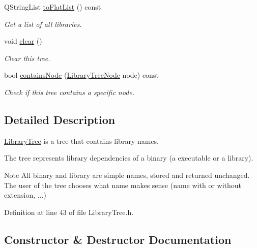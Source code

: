 \begin{DoxyCompactItemize}
Q\+String\+List \hyperlink{class_mdt_1_1_deploy_utils_1_1_library_tree_a7ee09eb33f1f392b66017d3ab7475f53}{to\+Flat\+List} () const 
\begin{DoxyCompactList}\small\item\em Get a list of all libraries. \end{DoxyCompactList}\item 
void \hyperlink{class_mdt_1_1_deploy_utils_1_1_library_tree_a1035b22adbe9c119339ce83a33ed8eba}{clear} ()
\begin{DoxyCompactList}\small\item\em Clear this tree. \end{DoxyCompactList}\item 
bool \hyperlink{class_mdt_1_1_deploy_utils_1_1_library_tree_a87fc3fa448d541cc97e6dd31f6288376}{contains\+Node} (\hyperlink{class_mdt_1_1_deploy_utils_1_1_library_tree_node}{Library\+Tree\+Node} node) const 
\begin{DoxyCompactList}\small\item\em Check if this tree contains a specific node. \end{DoxyCompactList}\end{DoxyCompactItemize}


\subsection{Detailed Description}
\hyperlink{class_mdt_1_1_deploy_utils_1_1_library_tree}{Library\+Tree} is a tree that contains library names. 

The tree represents library dependencies of a binary (a executable or a library).

\begin{DoxyNote}{Note}
All binary and library are simple names, stored and returned unchanged. The user of the tree chooses what name makes sense (name with or without extension, ...) 
\end{DoxyNote}


Definition at line 43 of file Library\+Tree.\+h.



\subsection{Constructor \& Destructor Documentation}
